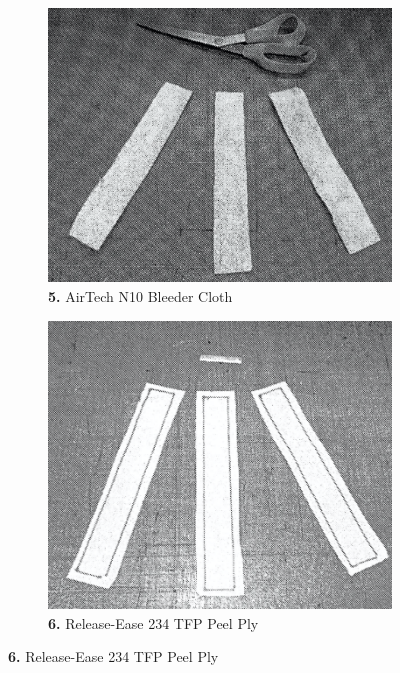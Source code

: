 \begin{figure}[!h]
  \begin{subfigure}[t]{.4\textwidth}
    \centering
    \includegraphics[width=\linewidth]{Pictures/Apparatus/Experiment 1/four.png}
    \caption{\textbf{5.} AirTech N10 Bleeder Cloth}
  \end{subfigure}
  \hfill
  \begin{subfigure}[t]{.4\textwidth}
    \centering
    \includegraphics[width=\linewidth]{Pictures/Apparatus/Experiment 1/five.png}
    \caption{\textbf{6.} Release-Ease 234 TFP Peel Ply}
  \end{subfigure}


\end{figure}
